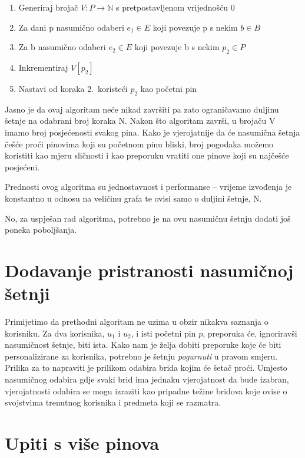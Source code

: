 \documentclass[times, utf8, seminar]{fer}
\begin{document}
\begin{enumerate}
	\item Generiraj brojač $V: P \to \mathbb{N}$ s pretpostavljenom vrijednošću 0
	\item Za dani p nasumično odaberi $e_1 \in E$ koji povezuje p s nekim $b \in B$
	\item Za b nasumično odaberi $e_2 \in E$ koji povezuje b s nekim $p_2 \in P$
	\item Inkrementiraj $V[p_2]$
	\item Nastavi od koraka 2.\ koristeći $p_2$ kao početni pin
\end{enumerate}

Jasno je da ovaj algoritam neće nikad završiti pa zato ograničavamo duljinu šetnje na odabrani broj koraka N. Nakon što algoritam završi, u brojaču V imamo broj posjećenosti svakog pina. Kako je vjerojatnije da će nasumična šetnja češće proći pinovima koji su početnom pinu bliski, broj pogodaka možemo koristiti kao mjeru sličnosti i kao preporuku vratiti one pinove koji su najčešće posjećeni.

Prednosti ovog algoritma su jednostavnost i performanse -- vrijeme izvođenja je konstantno u odnosu na veličinu grafa te ovisi samo o duljini šetnje, N.

No, za uspješan rad algoritma, potrebno je na ovu nasumičnu šetnju dodati još poneka poboljšanja.

\section{Dodavanje pristranosti nasumičnoj šetnji}

Primijetimo da prethodni algoritam ne uzima u obzir nikakva saznanja o korisniku. Za dva korisnika, $u_1$ i $u_2$, i isti početni pin $p$, preporuka će, ignoriravši nasumičnost šetnje, biti ista. Kako nam je želja dobiti preporuke koje će biti personalizirane za korisnika, potrebno je šetnju \textit{pogurnuti} u pravom smjeru. Prilika za to napraviti je prilikom odabira brida kojim će šetač proći. Umjesto nasumičnog odabira gdje svaki brid ima jednaku vjerojatnost da bude izabran, vjerojatnosti odabira se mogu izraziti kao pripadne težine bridova koje ovise o svojstvima trenutnog korisnika i predmeta koji se razmatra.

\section{Upiti s više pinova}
\label{multipin}
\end{document}
